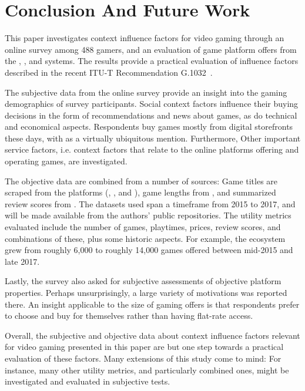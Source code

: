 \section{Conclusion And Future Work}
\label{sec:conclusion}

This paper investigates context influence factors for video gaming
through an online survey among 488 gamers, and an evaluation of
game platform offers from the \steam, \psnow, and \gfnow systems.
The results provide a practical evaluation of influence factors
described in the recent \acrshort{ITU-T} Recommendation
G.1032~\cite{itutg1032}.

The subjective data from the online survey provide an insight into
the gaming demographics of survey participants.
Social context factors influence their buying decisions in the
form of recommendations and news about games, as do technical and
economical aspects.
Respondents buy games mostly from digital storefronts these days,
with \steam as a virtually ubiquitous mention.
Furthermore, Other important service factors, i.e. context factors
that relate to the online platforms offering and operating games,
are investigated.

The objective data are combined from a number of sources:
Game titles are scraped from the platforms (\gfnow, \psnow, and \steam),
game lengths from \hltb, and summarized review scores from
\metacritic.
The datasets used span a timeframe from 2015 to 2017, and will
be made
available from the authors' public repositories.
The utility metrics evaluated include the number
of games, playtimes, prices, review scores, and combinations of these,
plus some historic aspects.
For example, the \steam ecosystem grew from roughly 6,000 to roughly
14,000 games offered between mid-2015 and late 2017.

Lastly, the survey also asked for subjective assessments of objective
platform properties. Perhaps unsurprisingly, a large variety of
motivations was reported there. An insight applicable to the size
of gaming offers is that respondents prefer to choose and buy for
themselves rather than having flat-rate access.

Overall, the subjective and objective data about context influence
factors relevant for video gaming presented in this paper are but
one step towards a practical evaluation of these factors.
Many extensions of this study come to mind:
For instance, many other utility metrics, and
particularly combined ones, might be investigated and evaluated
in subjective tests.

